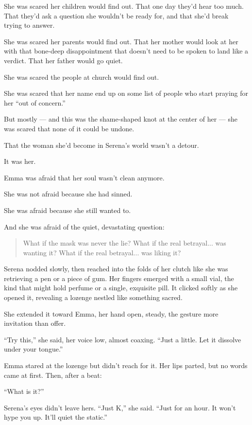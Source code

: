 She was scared her children would find out.
That one day they’d hear too much. That they'd ask a question she wouldn't be ready 
for, and that she'd break trying to answer.

She was scared her parents would find out.
That her mother would look at her with that bone-deep disappointment that doesn’t need to be spoken to 
land like a verdict.
That her father would go quiet.

She was scared the people at church would find out.

She was scared that her name end up on some list of people who start praying for her ``out of concern.''

But mostly --- and this was the shame-shaped knot at the center of her ---
she was scared that none of it could be undone.

That the woman she’d become in Serena’s world wasn’t a detour.

It was her.

Emma was afraid that her soul wasn’t clean anymore. 

She was not afraid because she had sinned. 

She was afraid because she still wanted to.

And she was afraid of the quiet, devastating question:

\begin{quote}
What if the mask was never the lie?
What if the real betrayal... was wanting it?
What if the real betrayal... was liking it?
\end{quote}

Serena nodded slowly, then reached into the folds of her clutch like she was retrieving a pen 
or a piece of gum. Her fingers emerged with a small vial, the kind that might hold perfume or a single, 
exquisite pill. It clicked softly as she opened it, revealing a lozenge nestled like something sacred.

She extended it toward Emma, her hand open, steady, the gesture more invitation than offer.

``Try this,'' she said, her voice low, almost coaxing. ``Just a little. Let it dissolve under your tongue.''

Emma stared at the lozenge but didn’t reach for it. Her lips parted, but no words came at first. Then, 
after a beat:

``What is it?''

Serena’s eyes didn’t leave hers. ``Just K,'' she said. ``Just for an hour. It won’t hype you up. It’ll 
quiet the static.''

